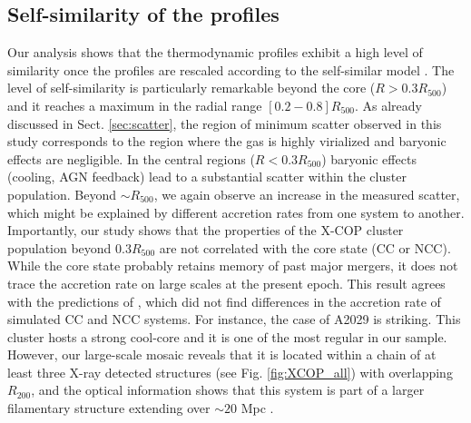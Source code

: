 \documentclass[traditabstract   ]{aa} %
\begin{document}
\subsection{Self-similarity of the profiles}

Our analysis shows that the thermodynamic profiles exhibit a high level of similarity once the profiles are rescaled according to the self-similar model \citep{kaiser86}. The level of self-similarity is particularly remarkable beyond the core ($R>0.3R_{500}$) and it reaches a maximum in the radial range $[0.2-0.8]R_{500}$. As already discussed in Sect. \ref{sec:scatter}, the region of minimum scatter observed in this study corresponds to the region where the gas is highly virialized and baryonic effects are negligible. In the central regions ($R<0.3R_{500}$) baryonic effects (cooling, AGN feedback) lead to a substantial scatter within the cluster population. Beyond $\sim R_{500}$, we again observe an increase in the measured scatter, which might be explained by different accretion rates from one system to another. Importantly, our study shows that the properties of the X-COP cluster population beyond $0.3R_{500}$ are not correlated with the core state (CC or NCC). While the core state probably retains memory of past major mergers, it does not trace the accretion rate on large scales at the present epoch. This result agrees with the predictions of \citet{planelles17}, which did not find differences in the accretion rate of simulated CC and NCC systems. For instance, the case of A2029 is striking. This cluster hosts a strong cool-core and it is one of the most regular in our sample. However, our large-scale mosaic reveals that it is located within a chain of at least three X-ray detected structures (see Fig. \ref{fig:XCOP_all}) with overlapping $R_{200}$, and the optical information shows that this system is part of a larger filamentary structure extending over $\sim20$ Mpc \citep{smith12}. 
\end{document}
